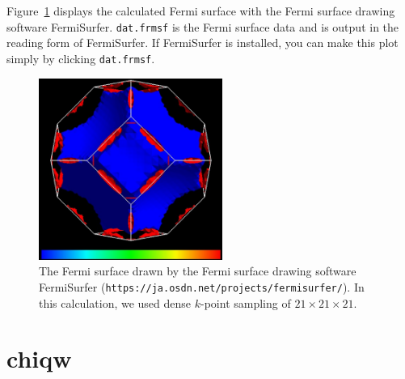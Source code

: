 \documentclass{article}
\begin{document}
Figure~\ref{frmsf-in-wannier-code} displays the calculated Fermi surface with the Fermi surface drawing software {\sc FermiSurfer}. \verb+dat.frmsf+ is the Fermi surface data and is output in the reading form of {\sc FermiSurfer}. If {\sc FermiSurfer} is installed, you can make this plot simply by clicking \verb+dat.frmsf+.
\begin{figure}[H] 
\centering
\includegraphics[width=6cm]{Al-21x21x21-frmsf.eps}
\caption{The Fermi surface drawn by the Fermi surface drawing software {\sc FermiSurfer} ({\tt https://ja.osdn.net/projects/fermisurfer/}). In this calculation, we used dense $k$-point sampling of $21\times21\times21$.} 
\label{frmsf-in-wannier-code}
\end{figure}

\clearpage

\section{chiqw}
\end{document}
